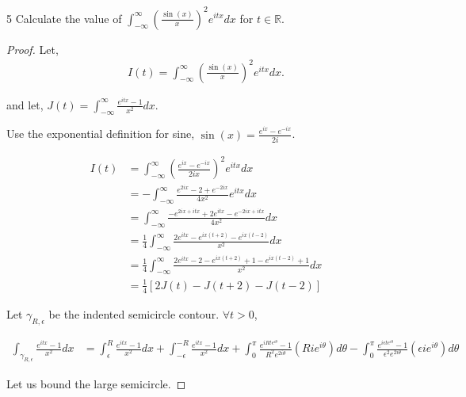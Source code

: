 \documentclass{article}
\newcommand{\R}{\mathbb{R}}
\begin{document}
\bigskip

\begin{PROB}{5}\label{Problem 5.}
    Calculate the value of $\int_{-\infty}^{\infty} \left(\frac{\sin(x)}{x}\right)^2 e^{itx} dx$ for $t \in \R$.   
\end{PROB}
\begin{proof}
    Let, 
    \begin{align*}
        I(t) = \int_{-\infty}^{\infty} \left(\frac{\sin(x)}{x}\right)^2 e^{itx} dx.
    \end{align*}

    and let, $J(t) = \int_{-\infty}^{\infty} \frac{e^{itx} - 1}{x^2}dx$. 

    Use the exponential definition for sine, $\sin(x) = \frac{e^{ix} - e^{-ix}}{2i}$.

    \begin{align*}
        I(t) &= \int_{-\infty}^{\infty} \left(\frac{e^{ix} - e^{-ix}}{2ix}\right)^2 e^{itx} dx\\
        &= -\int_{-\infty}^{\infty} \frac{e^{2ix} - 2 + e^{-2ix}}{4x^2} e^{itx} dx \\
        &= \int_{-\infty}^{\infty} \frac{-e^{2ix + itx} + 2e^{itx} - e^{-2ix + itx}}{4x^2}  dx \\
        &= \frac{1}{4}\int_{-\infty}^{\infty} \frac{2e^{itx} -e^{ix(t + 2)} - e^{ix(t - 2)}}{x^2}  dx 
        \\&= \frac{1}{4}\int_{-\infty}^{\infty} \frac{2e^{itx} - 2 -e^{ix(t + 2)} + 1 - e^{ix(t - 2)} + 1}{x^2}  dx \\ 
        &= \frac{1}{4} \left[2J(t) - J(t + 2) - J(t - 2)\right]
    \end{align*}


    Let $\gamma_{R, \epsilon}$ be the indented semicircle contour. $\forall t > 0$, 
    
    \begin{align*}
        \int_{\gamma_{R, \epsilon}} \frac{e^{itx} - 1}{x^2} dx &= \int_{\epsilon}^{R} \frac{e^{itx} - 1}{x^2} dx +\int_{-\epsilon}^{-R} \frac{e^{itx} - 1}{x^2} dx + \int_{0}^{\pi} \frac{e^{iRte^{i \theta}} - 1}{R^2e^{2i\theta}}\left(Rie^{i \theta}\right) d \theta - \int_{0}^{\pi} \frac{e^{i \epsilon te^{i \theta}} - 1}{\epsilon^2e^{2i\theta}}\left(\epsilon ie^{i \theta}\right) d \theta
    \end{align*}

    Let us bound the large semicircle.  


\end{proof}
\end{document}
